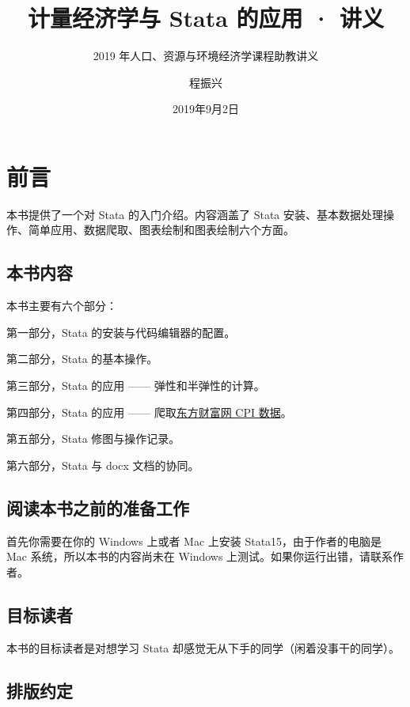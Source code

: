 \documentclass[cn,fancy,blue,11pt]{elegantbook}
\title{计量经济学与 Stata 的应用 · 讲义}
\subtitle{2019 年人口、资源与环境经济学课程助教讲义}
\author{程振兴}
\institute{https://czxa.top}
\date{2019年9月2日}
\begin{document}
\maketitle
\tableofcontents

\mainmatter
\hypersetup{pageanchor=true}

\hypertarget{section}{%
\chapter{前言}\label{section}}

本书提供了一个对 Stata 的入门介绍。内容涵盖了 Stata 安装、基本数据处理操作、简单应用、数据爬取、图表绘制和图表绘制六个方面。

\hypertarget{section-1}{%
\section{本书内容}\label{section-1}}

本书主要有六个部分：

第一部分，Stata 的安装与代码编辑器的配置。

第二部分，Stata 的基本操作。

第三部分，Stata 的应用 ------ 弹性和半弹性的计算。

第四部分，Stata 的应用 ------ 爬取\href{http://data.eastmoney.com/cjsj/cpi.html}{东方财富网 CPI 数据}。

第五部分，Stata 修图与操作记录。

第六部分，Stata 与 docx 文档的协同。

\hypertarget{section-2}{%
\section{阅读本书之前的准备工作}\label{section-2}}

首先你需要在你的 Windows 上或者 Mac 上安装 Stata15，由于作者的电脑是 Mac 系统，所以本书的内容尚未在 Windows 上测试。如果你运行出错，请联系作者。

\hypertarget{section-3}{%
\section{目标读者}\label{section-3}}

本书的目标读者是对想学习 Stata 却感觉无从下手的同学（闲着没事干的同学）。

\hypertarget{section-4}{%
\section{排版约定}\label{section-4}}
\end{document}

